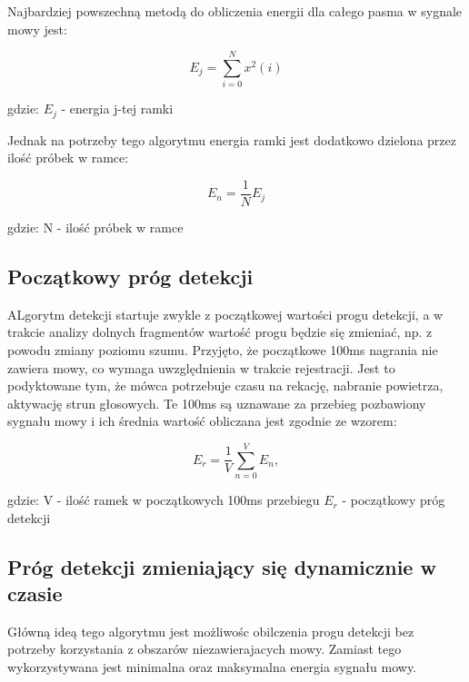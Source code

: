 \documentclass[eng,printmode]{mgr}
\begin{document}
 Najbardziej powszechną metodą do obliczenia energii dla całego pasma  w sygnale mowy jest:
 
 
 \begin{equation}
	 E_{j} =\sum_{i=0}^{N}x^2(i)
 \end{equation}
 
 \hspace{8cm}gdzie: $E_{j}$ - energia j-tej ramki
 
 Jednak na potrzeby tego algorytmu energia ramki jest dodatkowo dzielona przez ilość próbek w ramce:
 
 \begin{equation}
 E_{n} = \frac{1}{N} E_{j} 
 \end{equation}
 
 \hspace{8cm}gdzie: N - ilość próbek w ramce
 
 
  \subsection{Początkowy próg detekcji \cite{energyAlgorithm}}
  ALgorytm detekcji startuje zwykle z początkowej wartości progu detekcji, a w trakcie analizy dolnych fragmentów wartość progu będzie się zmieniać, np. z powodu zmiany poziomu szumu.
  Przyjęto, że początkowe 100ms nagrania nie zawiera mowy, co wymaga uwzględnienia w trakcie rejestracji. Jest to podyktowane tym, że mówca potrzebuje czasu na rekację, nabranie powietrza, aktywację strun głosowych. Te 100ms są uznawane za przebieg pozbawiony sygnału mowy i ich średnia wartość obliczana jest zgodnie ze wzorem:
  
  \begin{equation}
  E_{r} =\frac{1}{V}\sum_{n=0}^{V}E_{n},
  \end{equation}
  
  gdzie: V - ilość ramek w początkowych 100ms przebiegu \vspace{5mm}
					 \hspace{1cm}$ E_{r}$ - początkowy próg detekcji
  
  
  \subsection{Próg detekcji zmieniający się dynamicznie w czasie \cite{energyAlgorithm}}
  Główną ideą tego algorytmu jest możliwośc obilczenia progu detekcji bez potrzeby korzystania z obszarów niezawierajacych mowy. Zamiast tego wykorzystywana jest minimalna oraz maksymalna energia sygnału mowy.   
  
\end{document}
